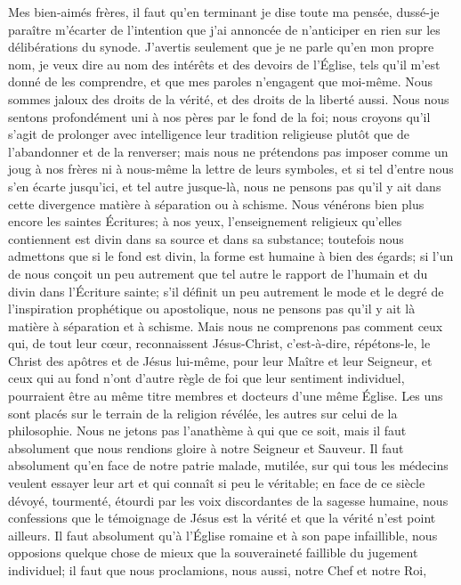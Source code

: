 Mes bien-aimés frères, il faut qu’en terminant je dise toute ma pensée, dussé-je paraître m’écarter de l’intention
que j’ai annoncée de n’anticiper en rien sur les délibérations du synode.
J’avertis seulement que je ne parle qu’en mon propre nom, \ocadr{} je veux dire au nom des intérêts
et des devoirs de l’Église, tels qu’il m’est donné de les comprendre, \fcadr{} et que mes paroles
n’engagent que moi-même.
Nous sommes jaloux des droits de la vérité, et des droits de la liberté aussi.
Nous nous sentons profondément uni à nos pères par le fond de la foi;
nous croyons qu’il s’agit de prolonger avec intelligence leur tradition religieuse
plutôt que de l’abandonner et de la renverser; mais nous ne prétendons pas imposer comme un joug à nos frères
ni à nous-même la lettre de leurs symboles, et si tel d’entre nous s’en écarte jusqu’ici,
et tel autre jusque-là, nous ne pensons pas qu’il y ait dans cette divergence matière à séparation ou à schisme.
Nous vénérons bien plus encore les saintes Écritures; à nos yeux, l’enseignement religieux qu’elles contiennent
est divin dans sa source et dans sa substance; toutefois nous admettons que si le fond est divin,
la forme est humaine à bien des égards; si l’un de nous conçoit un peu autrement que tel autre le rapport
de l’humain et du divin dans l’Écriture sainte; s’il définit un peu autrement le mode et le degré
de l’inspiration prophétique ou apostolique, nous ne pensons pas qu’il y ait là matière à séparation et à schisme.
Mais nous ne comprenons pas comment ceux qui, de tout leur cœur, reconnaissent Jésus-Christ, c’est-à-dire,
répétons-le, le Christ des apôtres et de Jésus lui-même, pour leur Maître et leur Seigneur,
et ceux qui au fond n’ont d’autre règle de foi que leur sentiment individuel,
pourraient être au même titre membres et docteurs d’une même Église.
Les uns sont placés sur le terrain de la religion révélée, les autres sur celui de la philosophie.
Nous ne jetons pas l’anathème à qui que ce soit, mais il faut absolument que nous rendions gloire à notre Seigneur et Sauveur.
Il faut absolument qu’en face de notre patrie malade, mutilée, sur qui tous les médecins veulent essayer
leur art et qui connaît si peu le véritable; en face de ce siècle dévoyé, tourmenté,
étourdi par les voix discordantes de la sagesse humaine, nous confessions que le témoignage de Jésus
est la vérité et que la vérité n’est point ailleurs.
Il faut absolument qu’à l’Église romaine et à son pape infaillible, nous opposions quelque chose de mieux
que la souveraineté faillible du jugement individuel; il faut que nous proclamions, nous aussi, notre Chef et notre Roi,
